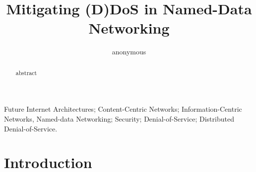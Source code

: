 \documentclass[conference]{IEEEtran}
\title{Mitigating (D)DoS in Named-Data Networking}%
\author{anonymous}
\date{}
\begin{document}
\maketitle

\begin{abstract}
%
abstract
%
\end{abstract}

 Future Internet Architectures;
Content-Centric Networks; Information-Centric Networks, Named-data
Networking; Security; Denial-of-Service; Distributed
Denial-of-Service.

\section{Introduction \label{intro}}



\end{document}
